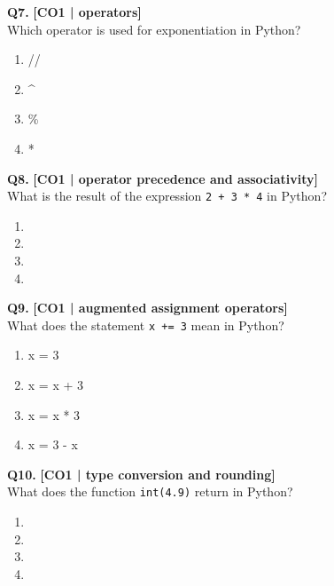 \noindent\textbf{Q7.} \hfill {\small\color{LPUOrange}\textbf{[CO1 | operators]}}\\[2pt]
Which operator is used for exponentiation in Python?

\begin{enumerate}[label=(\alph*),topsep=2pt,itemsep=1pt,partopsep=0pt,parsep=0pt]
    \item \relax //
    \item \relax \textasciicircum{}
    \item \relax \%
    \item \relax **
\end{enumerate}
\vspace{{2mm}}

\noindent\textbf{Q8.} \hfill {\small\color{LPUOrange}\textbf{[CO1 | operator precedence and associativity]}}\\[2pt]
What is the result of the expression \texttt{2 + 3 * 4} in Python?

\begin{enumerate}[label=(\alph*),topsep=2pt,itemsep=1pt,partopsep=0pt,parsep=0pt]
    \item {}
    \item {}
    \item {}
    \item {}
\end{enumerate}
\vspace{{2mm}}

\noindent\textbf{Q9.} \hfill {\small\color{LPUOrange}\textbf{[CO1 | augmented assignment operators]}}\\[2pt]
What does the statement \texttt{x += 3} mean in Python?

\begin{enumerate}[label=(\alph*),topsep=2pt,itemsep=1pt,partopsep=0pt,parsep=0pt]
    \item \relax x = 3
    \item \relax x = x + 3
    \item \relax x = x * 3
    \item \relax x = 3 - x
\end{enumerate}
\vspace{{2mm}}

\noindent\textbf{Q10.} \hfill {\small\color{LPUOrange}\textbf{[CO1 | type conversion and rounding]}}\\[2pt]
What does the function \texttt{int(4.9)} return in Python?

\begin{enumerate}[label=(\alph*),topsep=2pt,itemsep=1pt,partopsep=0pt,parsep=0pt]
    \item {}
    \item {}
    \item {}
    \item {}
\end{enumerate}
\vspace{{2mm}}

